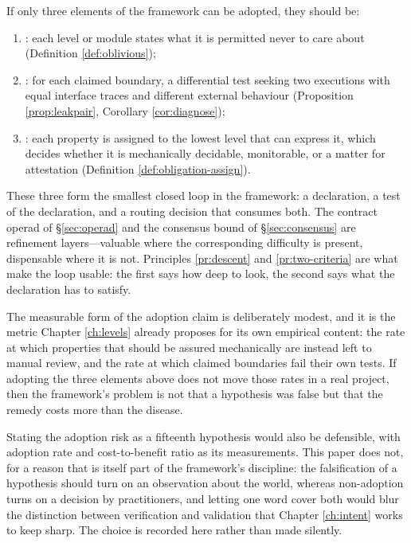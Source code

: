 \begin{principle}\label{pr:mvs}
If only three elements of the framework can be adopted, they should be:
\begin{enumerate}[label=(\alph*)]
\item {}: each level or module states what it is permitted never to
      care about (Definition \ref{def:oblivious});
\item {}: for each claimed boundary, a differential test seeking two executions
      with equal interface traces and different external behaviour (Proposition \ref{prop:leakpair},
      Corollary \ref{cor:diagnose});
\item {}: each property is assigned to the
      lowest level that can express it, which decides whether it is mechanically decidable,
      monitorable, or a matter for attestation (Definition \ref{def:obligation-assign}).
\end{enumerate}
These three form the smallest closed loop in the framework: a declaration, a test of the declaration,
and a routing decision that consumes both. The contract operad of \S\ref{sec:operad} and the consensus
bound of \S\ref{sec:consensus} are refinement layers---valuable where the corresponding difficulty is
present, dispensable where it is not. Principles \ref{pr:descent} and \ref{pr:two-criteria} are what
make the loop usable: the first says how deep to look, the second says what the declaration has to
satisfy.
\end{principle}

The measurable form of the adoption claim is deliberately modest, and it is the metric Chapter
\ref{ch:levels} already proposes for its own empirical content: the rate at which properties that
should be assured mechanically are instead left to manual review, and the rate at which claimed
boundaries fail their own tests. If adopting the three elements above does not move those rates in a
real project, then the framework's problem is not that a hypothesis was false but that the remedy
costs more than the disease.

Stating the adoption risk as a fifteenth hypothesis would also be defensible, with adoption rate and
cost-to-benefit ratio as its measurements. This paper does not, for a reason that is itself part of
the framework's discipline: the falsification of a hypothesis should turn on an observation about the
world, whereas non-adoption turns on a decision by practitioners, and letting one word cover both
would blur the distinction between verification and validation that Chapter \ref{ch:intent} works to
keep sharp. The choice is recorded here rather than made silently.
